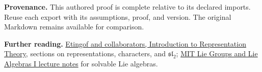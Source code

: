 \documentclass[preprint,12pt,aps,pra,showkeys,amsmath,amssymb,superscriptaddress,floatfix]{revtex4-2}
\theoremstyle{definition}
\theoremstyle{remark}
\begin{document}
\par\medskip\begingroup\small\linespread{1.0}\selectfont\noindent\textbf{Provenance.} This authored proof is complete relative to its declared imports. Reuse
each export with its assumptions, proof, and version. The original
Markdown remains available for comparison.
\par\endgroup

\par\smallskip\begingroup\small\linespread{1.0}\selectfont\noindent\textbf{Further reading.} \href{https://math.mit.edu/~etingof/reprbook.pdf}{Etingof and
collaborators, Introduction to Representation Theory}, sections on
representations, characters, and \(\mathfrak{sl}_2\);
\href{https://ocw.mit.edu/courses/18-745-lie-groups-and-lie-algebras-i-fall-2020/lists/lecture-notes/}{MIT
Lie Groups and Lie Algebras I lecture notes} for solvable Lie algebras.\par\endgroup
\end{document}
